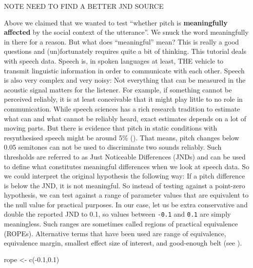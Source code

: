 \documentclass[
  doc,
  longtable,
  nolmodern,
  notxfonts,
  notimes,
  colorlinks=true,linkcolor=blue,citecolor=blue,urlcolor=blue]{apa7}
\newenvironment{Shaded}{\begin{snugshade}}{\end{snugshade}}
\newcommand{\FloatTok}[1]{\textcolor[rgb]{0.68,0.00,0.00}{#1}}
\newcommand{\FunctionTok}[1]{\textcolor[rgb]{0.28,0.35,0.67}{#1}}
\newcommand{\NormalTok}[1]{\textcolor[rgb]{0.00,0.23,0.31}{#1}}
\newcommand{\OtherTok}[1]{\textcolor[rgb]{0.00,0.23,0.31}{#1}}
\newcommand{\SpecialCharTok}[1]{\textcolor[rgb]{0.37,0.37,0.37}{#1}}
\begin{document}
NOTE NEED TO FIND A BETTER JND SOURCE

Above we claimed that we wanted to test ``whether pitch is
\textbf{meaningfully affected} by the social context of the utterance''.
We snuck the word meaningfully in there for a reason. But what does
``meaningful'' mean? This is really a good questions and (un)fortunately
requires quite a bit of thinking. This tutorial deals with speech data.
Speech is, in spoken languages at least, THE vehicle to transmit
linguistic information in order to communicate with each other. Speech
is also very complex and very noisy: Not everything that can be measured
in the acoustic signal matters for the listener. For example, if
something cannot be perceived reliably, it is at least conceivable that
it might play little to no role in communication. While speech sciences
has a rich research tradition to estimate what can and what cannot be
reliably heard, exact estimates depends on a lot of moving parts. But
there is evidence that pitch in static conditions with resynthesised
speech might be around 5\%
(). That means, pitch changes below 0.05 semitones can
not be used to discriminate two sounds reliably. Such thresholds are
referred to as Just Noticeable Differences (JNDs) and can be used to
define what constitutes meaningful differences when we look at speech
data. So we could interpret the original hypothesis the following way:
If a pitch difference is below the JND, it is not meaningful. So instead
of testing against a point-zero hypothesis, we can test against a range
of parameter values that are equivalent to the null value for practical
purposes. In our case, let us be extra conservative and double the
reported JND to 0.1, so values between \texttt{-0.1} and \texttt{0.1}
are simply meaningless. Such ranges are sometimes called regions of
practical equivalence (ROPEs). Alternative terms that have been used are
range of equivalence, equivalence margin, smallest effect size of
interest, and good-enough belt (see
).

\begin{Shaded}
\begin{Highlighting}[]
\NormalTok{rope }\OtherTok{\textless{}{-}} \FunctionTok{c}\NormalTok{(}\SpecialCharTok{{-}}\FloatTok{0.1}\NormalTok{,}\FloatTok{0.1}\NormalTok{)}
\end{Highlighting}
\end{Shaded}
\end{document}
